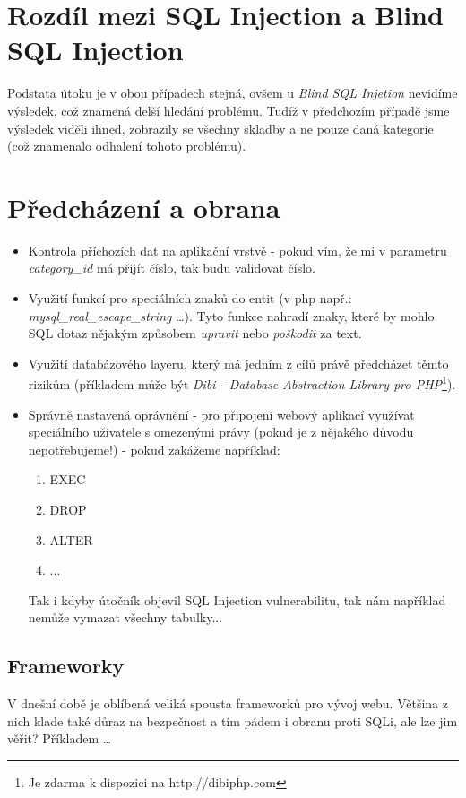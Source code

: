 \documentclass[12pt, a4paper]{report}
\begin{document}
\section{Rozdíl mezi SQL Injection a Blind SQL Injection}
Podstata útoku je v obou případech stejná, ovšem u \textit{Blind SQL Injetion} nevidíme výsledek, což znamená delší hledání problému. Tudíž v předchozím případě jsme výsledek viděli ihned, zobrazily se všechny skladby a ne pouze daná kategorie (což znamenalo odhalení tohoto problému). 

\section{Předcházení a obrana}
\begin{itemize}
\item Kontrola příchozích dat na aplikační vrstvě - pokud vím, že mi v parametru \textit{category\_id} má přijít číslo, tak budu validovat číslo.
\item Využití funkcí pro  speciálních znaků do entit (v php např.: \textit{mysql\_real\_escape\_string} \ldots). Tyto funkce nahradí znaky, které by mohlo SQL dotaz nějakým způsobem \textit{upravit} nebo \textit{poškodit} za text.
\item Využití databázového layeru, který má jedním z cílů právě předcházet těmto rizikům (příkladem může být \textit{Dibi - Database Abstraction Library pro PHP}\footnote{Je zdarma k dispozici na http://dibiphp.com}).
\item Správně nastavená oprávnění - pro připojení webový aplikací využívat speciálního uživatele s omezenými právy (pokud je z nějakého důvodu nepotřebujeme!) - pokud zakážeme například:
\begin{enumerate}
\item EXEC
\item DROP
\item ALTER
\item ...
\end{enumerate}
Tak i kdyby útočník objevil SQL Injection vulnerabilitu, tak nám například nemůže vymazat všechny tabulky...
\end{itemize}
\subsection{Frameworky}
V dnešní době je oblíbená veliká spousta frameworků pro vývoj webu. Většina z nich klade také důraz na bezpečnost a tím pádem i obranu proti SQLi, ale lze jim věřit? Příkladem \ldots
\end{document}
